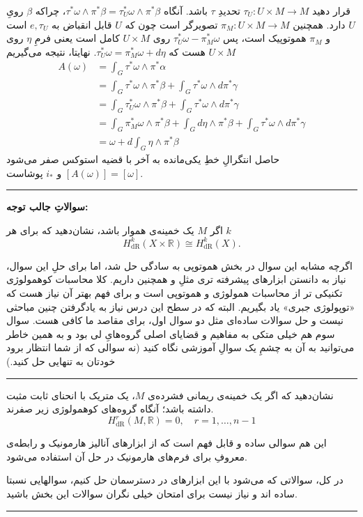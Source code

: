 \documentclass[a4paper, 12pt]{article}
\begin{document}
قرار دهید $\tau_U: U \times M \rightarrow M$ 
تحدیدِ $\tau$ باشد.
 آنگاه $\tau^* \omega \wedge \pi^* \beta=\tau_U^* \omega \wedge \pi^* \beta$،
  چراکه $\beta$
  رویِ $U$
  دارد.
    همچنین $\pi_M: U \times M \rightarrow M$
    تصویرگر است چون که  $U$
      قابل انقباض به $e, \tau_U$
       است و  $\pi_M$
        هموتوپیک است، پس $\tau_U^* \omega-\pi_M^* \omega$
        روی $U \times M$ کامل است
         یعنی فرمِ $\eta$ روی  $U \times M$
         هست که $\tau_U^* \omega=\pi_M^* \omega+d \eta$.
نهایتا، نتیجه می‌گیریم
$$
\begin{aligned}
	A(\omega) & =\int_G \tau^* \omega \wedge \pi^* \alpha \\
	& =\int_G \tau^* \omega \wedge \pi^* \beta+\int_G \tau^* \omega \wedge d \pi^* \gamma \\
	& =\int_G \tau_U^* \omega \wedge \pi^* \beta+\int_G \tau^* \omega \wedge d \pi^* \gamma \\
	& =\int_G \pi_M^* \omega \wedge \pi^* \beta+\int_G d \eta \wedge \pi^* \beta+\int_G \tau^* \omega \wedge d \pi^* \gamma \\
	& =\omega+d \int_G \eta \wedge \pi^* \beta
\end{aligned}
$$
حاصل انتگرالِ خطِ یکی‌مانده به آخر با قضیه استوکس صفر می‌شود $[A(\omega)]=[\omega]$ و $i_*$
پوشاست.



\par\noindent\rule{\textwidth}{2pt}


\vspace{0.5em}
\noindent
\textbf{سوالاتِ جالب توجه:}

اگر $M$ یک خمینه‌ی هموار باشد، نشان‌دهید که برای هر $k$
\[H_{\text{dR}}^k(X\times \mathbb{R}) \cong H^k_{\text{dR}} (X).
\]

اگرچه مشابه این سوال در بخش هموتوپی به سادگی حل شد، اما برای حلِ این سوال، نیاز به دانستن ابزارهای پیشرفته تری مثلِ 
و همچنین 
داریم. کلا محاسبات کوهمولوژی تکنیکی تر از محاسبات همولوژی و هموتوپی است و برای فهم بهتر آن نیاز هست که «توپولوژی جبری» یاد بگیریم. البته که در سطح این درس نیاز به یادگرفتن چنین مباحثی نیست و حل سوالات ساده‌ای مثل دو سوال اول، برای مقاصد ما کافی هست. سوال سوم هم خیلی متکی به مفاهیم و قضایای اصلی گروه‌هایِ لی بود و به همین خاطر می‌توانید به آن به چشمِ یک سوالِ آموزشی نگاه کنید (نه سوالی که از شما انتظار برود خودتان به تنهایی حل کنید.)

\par\noindent\rule{\textwidth}{0.6pt}

نشان‌دهید که اگر یک خمینه‌ی ریمانی فشرده‌ی $M$، یک متریک با انحنای ثابت مثبت داشته باشد؛ آنگاه گروه‌های کوهمولوژی زیر صفرند.
\[
H^r_{\text{dR}}(M,\mathbb{R}) = 0 , \quad r=1 ,\dots, n-1
\]

این هم سوالی ساده و قابل فهم است که از ابزارهای آنالیز هارمونیک و رابطه‌ی معروفِ
برای فرم‌های هارمونیک در حل آن استفاده می‌شود.

در کل، سوالاتی که می‌شود با این ابزارهای در دسترسمان حل کنیم، سوالهایی نسبتا ساده اند و نیاز نیست برای امتحان خیلی نگران سوالات این بخش باشید.
\par\noindent\rule{\textwidth}{2pt}
\end{document}
